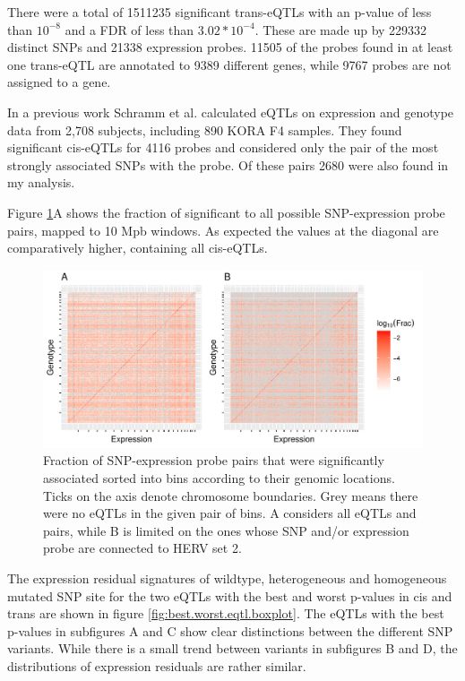 \documentclass[a4paper,12pt,twoside,openright]{article}
\begin{document}
There were a total of 1511235 significant trans-eQTLs with an p-value of less than $10^{-8}$ and a FDR of less than $3.02*10^{-4}$. These are made up by 229332 distinct SNPs and 21338 expression probes. 11505 of the probes found in at least one trans-eQTL are annotated to 9389 different genes, while 9767 probes are not assigned to a gene.

In a previous work Schramm et al. \cite{10.1371/journal.pone.0093844} calculated eQTLs on expression and genotype data from 2,708 subjects, including 890 KORA F4 samples. They found significant cis-eQTLs for 4116 probes and considered only the pair of the most strongly associated SNPs with the probe. Of these pairs 2680 were also found in my analysis. 

Figure \ref{fig:global.eqtl.heatmap}A shows the fraction of significant to all possible  SNP-expression probe pairs, mapped to 10 Mpb windows. As expected the values at the diagonal are comparatively higher, containing all cis-eQTLs. 

\begin{figure}[tb]
	\includegraphics[scale = 1, keepaspectratio = true]{../figures/eqtl_all_herv_heatmap}  
	\caption{Fraction of SNP-expression probe pairs that were significantly associated sorted into bins according to their genomic locations. Ticks on the axis denote chromosome boundaries. Grey means there were no eQTLs in the given pair of bins. A considers all eQTLs and pairs, while B is limited on the ones whose SNP and/or expression probe are connected to HERV set 2.}
    \label{fig:global.eqtl.heatmap}
\end{figure}

The expression residual signatures of wildtype, heterogeneous and homogeneous mutated SNP site for the two eQTLs with the best and worst p-values in cis and trans are shown in figure \ref{fig:best.worst.eqtl.boxplot}. The eQTLs with the best p-values in subfigures A and C show clear distinctions between the different SNP variants. While there is a small trend between variants in subfigures B and D, the distributions of expression residuals are rather similar.    
\end{document}
